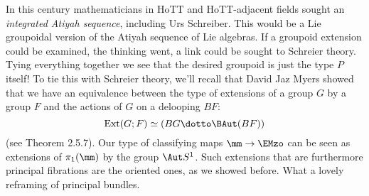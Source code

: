 In this century mathematicians in HoTT and HoTT-adjacent fields sought an \emph{integrated Atiyah sequence}, including Urs Schreiber\cite{urs_atiyah}\cite{urs_atiyah_blog}. This would be a Lie groupoidal version of the Atiyah sequence of Lie algebras. If a groupoid extension could be examined, the thinking went, a link could be sought to Schreier theory. Tying everything together we see that the desired groupoid is just the type \( P \) itself! To tie this with Schreier theory, we'll recall that David Jaz Myers showed that we have an equivalence between the type of extensions of a group \( G \) by a group \( F \) and the actions of \( G \) on a delooping \( BF \):
\[ 
\mathrm{Ext}(G; F) \simeq (BG \dotto \BAut(BF))
\]
(see \cite{myersthesis} Theorem 2.5.7). Our type of classifying maps \( \mm\to\EMzo \) can be seen as extensions of \( \pi_1(\mm) \) by the group \( \Aut S^1 \). Such extensions that are furthermore principal fibrations are the oriented ones, as we showed before. What a lovely reframing of principal bundles.
